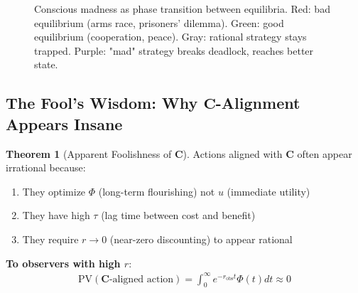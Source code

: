 \documentclass[11pt,a4paper]{article}
\theoremstyle{definition}
\newtheorem{theorem}{Theorem}[section]
\theoremstyle{remark}
\begin{document}
\begin{enumerate}
\begin{figure}[H]
\caption{Conscious madness as phase transition between equilibria. Red: bad equilibrium (arms race, prisoners' dilemma). Green: good equilibrium (cooperation, peace). Gray: rational strategy stays trapped. Purple: "mad" strategy breaks deadlock, reaches better state.}
\label{fig:madness_wisdom}
\end{figure}

\subsection{The Fool's Wisdom: Why \(\mathbf{C}\)-Alignment Appears Insane}

\begin{theorem}[Apparent Foolishness of \(\mathbf{C}\)]
Actions aligned with \(\mathbf{C}\) often appear irrational because:

\begin{enumerate}
    \item They optimize \(\Phi\) (long-term flourishing) not \(u\) (immediate utility)
    \item They have high \(\tau\) (lag time between cost and benefit)
    \item They require \(r \to 0\) (near-zero discounting) to appear rational
\end{enumerate}

\textbf{To observers with high \(r\)}:
\begin{align}
\text{PV}(\mathbf{C}\text{-aligned action}) = \int_0^\infty e^{-r_{\text{obs}} t} \Phi(t) dt \approx 0
\end{align}


\end{theorem}
\end{enumerate}
\end{document}
